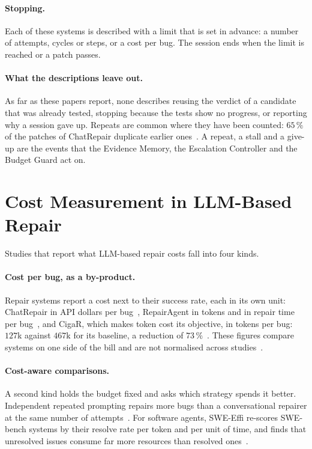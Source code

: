 \paragraph{Stopping.} Each of these systems is described with a limit that is
set in advance: a number of attempts, cycles or steps, or a cost per bug. The
session ends when the limit is reached or a patch passes.

\paragraph{What the descriptions leave out.} As far as these papers report,
none describes reusing the verdict of a candidate that was already tested,
stopping because the tests show no progress, or reporting why a session gave
up. Repeats are common where they have been counted: $65\,\%$ of the patches
of ChatRepair duplicate earlier ones~\citep{chen2025conversational}. A repeat,
a stall and a give-up are the events that the Evidence Memory, the Escalation
Controller and the Budget Guard act on.

\section{Cost Measurement in LLM-Based Repair}
\label{sec:rel-cost}

Studies that report what LLM-based repair costs fall into four kinds.

\paragraph{Cost per bug, as a by-product.} Repair systems report a cost next to
their success rate, each in its own unit: ChatRepair in API dollars per
bug~\citep{xia2024chatrepair}, RepairAgent in tokens and in repair time
per bug~\citep{bouzenia2025repairagent}, and CigaR, which makes token
cost its objective, in tokens per bug: $127$k against $467$k for its baseline,
a reduction of $73\,\%$~\citep{hidvegi2024cigar}. These figures compare systems
on one side of the bill and are not normalised across
studies~\citep{yang2025llmrepairsurvey}.

\paragraph{Cost-aware comparisons.} A second kind holds the budget fixed and
asks which strategy spends it better. Independent repeated prompting repairs
more bugs than a conversational repairer at the same number of
attempts~\citep{chen2025conversational}. For software agents,
SWE-Effi re-scores SWE-bench systems by their resolve rate per token
and per unit of time, and finds that unresolved issues consume far more
resources than resolved ones~\citep{fan2025sweeffi}.

